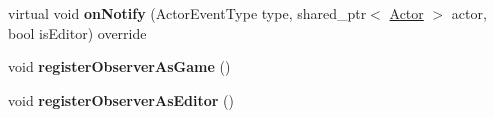 \begin{DoxyCompactItemize}
\item 
\hypertarget{class_world_abdfbd33f4422c97910247692bf313a01}{}virtual void {\bfseries on\+Notify} (Actor\+Event\+Type type, shared\+\_\+ptr$<$ \hyperlink{class_actor}{Actor} $>$ actor, bool is\+Editor) override\label{class_world_abdfbd33f4422c97910247692bf313a01}

\item 
\hypertarget{class_world_a02c5e9664e391f87e3430e6598a679d0}{}void {\bfseries register\+Observer\+As\+Game} ()\label{class_world_a02c5e9664e391f87e3430e6598a679d0}

\item 
\hypertarget{class_world_a63c108380a6aa9080f8c90cbd3c245d9}{}void {\bfseries register\+Observer\+As\+Editor} ()\label{class_world_a63c108380a6aa9080f8c90cbd3c245d9}

\end{DoxyCompactItemize}

